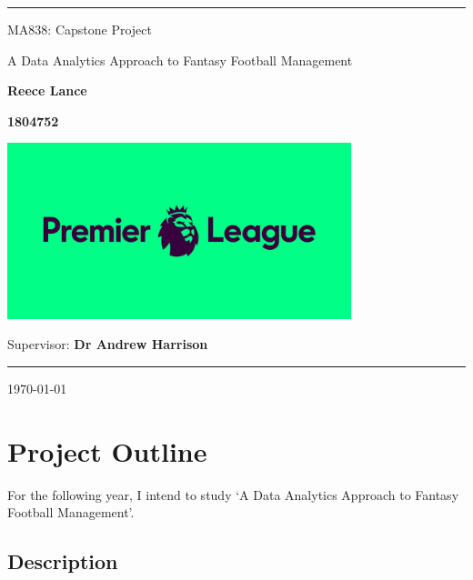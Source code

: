 \documentclass[12pt, a4paper,oneside]{book}
\numberwithin{equation}{section}
\begin{document}
\begin{center}

\noindent\textcolor{prempurple}{\rule{\linewidth}{4.8pt}}

\vspace{1cm}

{\LARGE \sc  MA838: Capstone Project}

\vspace{1.5cm}

{\Huge{A Data Analytics Approach to Fantasy Football Management}}

\vspace{1.5cm}

{\Large \bf Reece Lance}

\vspace{0.5cm}

{\Large \bf 1804752}

\vspace{1.5cm}

\centerline{\includegraphics[width=0.75\textwidth]{prem_logo.jpeg}}

\vspace{1.5cm}

{\Large {Supervisor:} {\bf Dr Andrew Harrison}}

\vspace{.25cm}

\noindent\textcolor{prempurple}{\rule{\linewidth}{4.8pt}}

\vspace{1cm}
{\Large \today }\\[4pt]
\end{center}
\newpage

\chapter{Project Outline}\label{ch:1}

For the following year, I intend to study `A Data Analytics Approach to Fantasy Football
Management'.

\section{Description}\label{sec:1.1}
\end{document}
